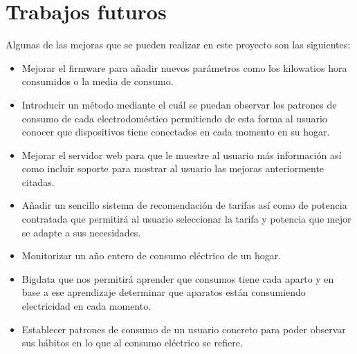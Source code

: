 \section{Trabajos futuros}
Algunas de las mejoras que se pueden realizar en este proyecto son las siguientes:

\begin{itemize}
	\item Mejorar el firmware para añadir nuevos parámetros como los kilowatios hora consumidos o la media de consumo.
	\item Introducir un método mediante el cuál se puedan observar los patrones de consumo de cada electrodoméstico permitiendo de esta forma al usuario conocer que dispositivos tiene conectados en cada momento en su hogar.
	\item Mejorar el servidor web para que le muestre al usuario más información así como incluir soporte para mostrar al usuario las mejoras anteriormente citadas.
	\item Añadir un sencillo sistema de recomendación de tarifas así como de potencia contratada que permitirá al usuario seleccionar la tarifa y potencia que mejor se adapte a sus necesidades.
	\item Monitorizar un año entero de consumo eléctrico de un hogar.
	\item Bigdata que nos permitirá aprender que consumos tiene cada aparto y en base a ese aprendizaje determinar que aparatos están consumiendo electricidad en cada momento.
	\item Establecer patrones de consumo de un usuario concreto para poder observar sus hábitos en lo que al consumo eléctrico se refiere.
\end{itemize}
